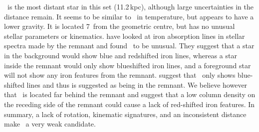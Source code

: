 \stare\ is the most distant star in this set (11.2\,kpc), although large uncertainties in the distance remain. It seems to be similar to \starg\ in temperature, but appears to have a lower gravity. It is located 7\arcsec\ from the geometric centre, but has no unusual stellar parameters or kinematics. \citet{2007PASJ...59..811I} have looked at iron absorption lines in stellar spectra made by the remnant and found \stare\ to be unusual. They suggest that a star in the background would show blue and redshifted iron lines, whereas a star inside the remnant would only show blueshifted iron lines, and a foreground star will not show any iron features from the remnant. \citet{2007PASJ...59..811I}  suggest that \stare\ only shows blue-shifted lines and thus is suggested as being in the remnant. We believe however that \stare\ is located far behind the remnant and suggest that a low column density on the receding side of the remnant could cause a lack of red-shifted iron features.  In summary, a lack of rotation,  kinematic signatures, and an inconsistent distance make \stare\ a very weak candidate.

